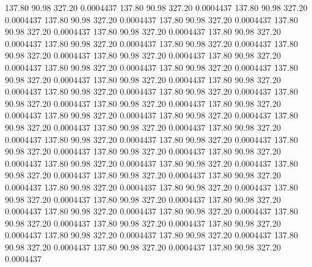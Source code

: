  137.80   90.98  327.20   0.0004437
 137.80   90.98  327.20   0.0004437
 137.80   90.98  327.20   0.0004437
 137.80   90.98  327.20   0.0004437
 137.80   90.98  327.20   0.0004437
 137.80   90.98  327.20   0.0004437
 137.80   90.98  327.20   0.0004437
 137.80   90.98  327.20   0.0004437
 137.80   90.98  327.20   0.0004437
 137.80   90.98  327.20   0.0004437
 137.80   90.98  327.20   0.0004437
 137.80   90.98  327.20   0.0004437
 137.80   90.98  327.20   0.0004437
 137.80   90.98  327.20   0.0004437
 137.80   90.98  327.20   0.0004437
 137.80   90.98  327.20   0.0004437
 137.80   90.98  327.20   0.0004437
 137.80   90.98  327.20   0.0004437
 137.80   90.98  327.20   0.0004437
 137.80   90.98  327.20   0.0004437
 137.80   90.98  327.20   0.0004437
 137.80   90.98  327.20   0.0004437
 137.80   90.98  327.20   0.0004437
 137.80   90.98  327.20   0.0004437
 137.80   90.98  327.20   0.0004437
 137.80   90.98  327.20   0.0004437
 137.80   90.98  327.20   0.0004437
 137.80   90.98  327.20   0.0004437
 137.80   90.98  327.20   0.0004437
 137.80   90.98  327.20   0.0004437
 137.80   90.98  327.20   0.0004437
 137.80   90.98  327.20   0.0004437
 137.80   90.98  327.20   0.0004437
 137.80   90.98  327.20   0.0004437
 137.80   90.98  327.20   0.0004437
 137.80   90.98  327.20   0.0004437
 137.80   90.98  327.20   0.0004437
 137.80   90.98  327.20   0.0004437
 137.80   90.98  327.20   0.0004437
 137.80   90.98  327.20   0.0004437
 137.80   90.98  327.20   0.0004437
 137.80   90.98  327.20   0.0004437
 137.80   90.98  327.20   0.0004437
 137.80   90.98  327.20   0.0004437
 137.80   90.98  327.20   0.0004437
 137.80   90.98  327.20   0.0004437
 137.80   90.98  327.20   0.0004437
 137.80   90.98  327.20   0.0004437
 137.80   90.98  327.20   0.0004437
 137.80   90.98  327.20   0.0004437
 137.80   90.98  327.20   0.0004437
 137.80   90.98  327.20   0.0004437
 137.80   90.98  327.20   0.0004437
